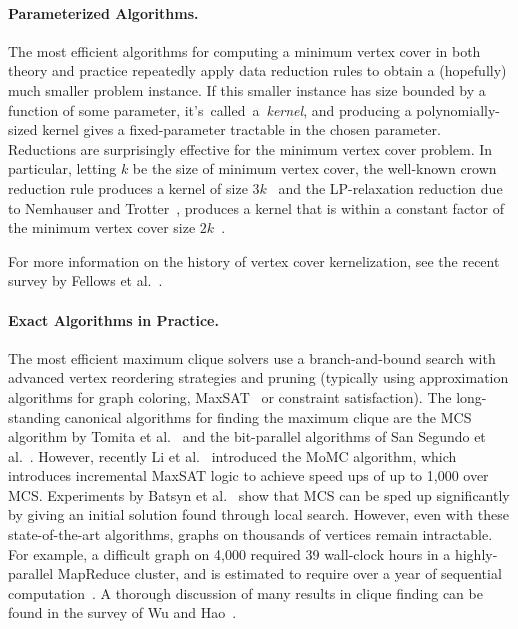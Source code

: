 \documentclass[twoside,leqno,twocolumn]{article}
\begin{document}
\paragraph*{Parameterized Algorithms.}
The most efficient algorithms for computing a minimum vertex cover in both theory and practice repeatedly apply data reduction rules to obtain a (hopefully) much smaller problem instance. If this smaller instance has size bounded by a function of some parameter, it's~called~a~\emph{kernel}, and producing a polynomially-sized kernel gives a fixed-parameter tractable in the chosen parameter. Reductions are surprisingly effective for the minimum vertex cover problem. In particular, letting $k$ be the size of minimum vertex cover, the well-known crown reduction rule produces a kernel of size $3k$~\cite{chor2005linear} and the LP-relaxation reduction due to Nemhauser and Trotter~\cite{nemhauser-1975}, produces a kernel that is within a constant factor of the minimum vertex cover size $2k$~\cite{chen1999}.

For more information on the history of vertex cover kernelization, see the recent survey by Fellows et al.~\cite{fellows2018known}.

\paragraph*{Exact Algorithms in Practice.}
The most efficient maximum clique solvers use a branch-and-bound search with advanced vertex reordering strategies and pruning (typically using approximation algorithms for graph coloring, MaxSAT~\cite{li-maxsat-2013} or constraint satisfaction). The long-standing canonical algorithms for finding the maximum clique are the MCS algorithm by Tomita et al.~\cite{tomita-recoloring} and the bit-parallel algorithms of San Segundo et al.~\cite{segundo-recoloring,segundo-bitboard-2011}. However, recently Li et al.~\cite{DBLP:journals/cor/LiJM17} introduced the MoMC algorithm, which introduces incremental MaxSAT logic to achieve speed ups of up to 1,000 over MCS. Experiments by Batsyn et al.~\cite{batsyn-mcs-ils-2014} show that MCS can be sped up significantly by giving an initial solution found through local search. However, even with these state-of-the-art algorithms, graphs on thousands of vertices remain intractable. For example, a difficult graph on 4,000 required 39 wall-clock hours in a highly-parallel MapReduce cluster, and is estimated to require over a year of sequential computation~\cite{xiang-2013}. A thorough discussion of many results in clique finding can be found in the survey of Wu and Hao~\cite{wu-hao-2015}.
\end{document}
